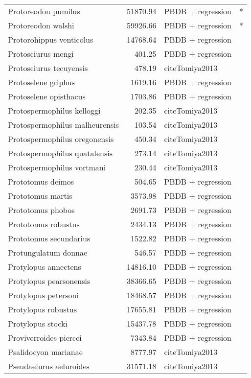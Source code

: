 \begin{table}[ht]
\begin{tabular}{lrll}
  Protoreodon pumilus & 51870.94 & PBDB + regression & * \\ 
  Protoreodon walshi & 59926.66 & PBDB + regression & * \\ 
  Protorohippus venticolus & 14768.64 & PBDB + regression &  \\ 
  Protosciurus mengi & 401.25 & PBDB + regression &  \\ 
  Protosciurus tecuyensis & 478.19 & cite{Tomiya2013} &  \\ 
  Protoselene griphus & 1619.16 & PBDB + regression &  \\ 
  Protoselene opisthacus & 1703.86 & PBDB + regression &  \\ 
  Protospermophilus kelloggi & 202.35 & cite{Tomiya2013} &  \\ 
  Protospermophilus malheurensis & 103.54 & cite{Tomiya2013} &  \\ 
  Protospermophilus oregonensis & 450.34 & cite{Tomiya2013} &  \\ 
  Protospermophilus quatalensis & 273.14 & cite{Tomiya2013} &  \\ 
  Protospermophilus vortmani & 230.44 & cite{Tomiya2013} &  \\ 
  Prototomus deimos & 504.65 & PBDB + regression &  \\ 
  Prototomus martis & 3573.98 & PBDB + regression &  \\ 
  Prototomus phobos & 2691.73 & PBDB + regression &  \\ 
  Prototomus robustus & 2434.13 & PBDB + regression &  \\ 
  Prototomus secundarius & 1522.82 & PBDB + regression &  \\ 
  Protungulatum donnae & 546.57 & PBDB + regression &  \\ 
  Protylopus annectens & 14816.10 & PBDB + regression &  \\ 
  Protylopus pearsonensis & 38366.65 & PBDB + regression &  \\ 
  Protylopus petersoni & 18468.57 & PBDB + regression &  \\ 
  Protylopus robustus & 17655.81 & PBDB + regression &  \\ 
  Protylopus stocki & 15437.78 & PBDB + regression &  \\ 
  Proviverroides piercei & 7343.84 & PBDB + regression &  \\ 
  Psalidocyon marianae & 8777.97 & cite{Tomiya2013} &  \\ 
  Pseudaelurus aeluroides & 31571.18 & cite{Tomiya2013} &  \\ 

\end{tabular}
\end{table}
